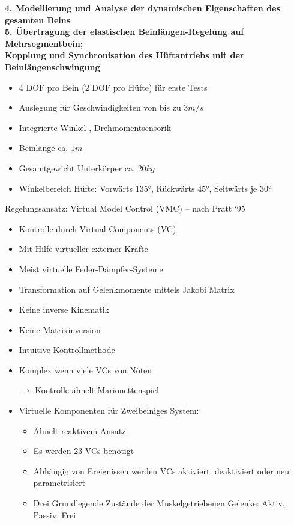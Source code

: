 \textbf{4. Modellierung und Analyse der dynamischen Eigenschaften des gesamten Beins\\
5. Übertragung der elastischen Beinlängen-Regelung auf Mehrsegmentbein;\\
Kopplung und Synchronisation des Hüftantriebs mit der Beinlängenschwingung}
\begin{itemize}
\item 4 DOF pro Bein (2 DOF pro Hüfte) für erste Tests
\item Auslegung für Geschwindigkeiten von bis zu $3m/s$
\item Integrierte Winkel-, Drehmomentsensorik
\item Beinlänge ca. $1m$
\item Gesamtgewicht Unterkörper ca. $20kg$
\item Winkelbereich Hüfte: Vorwärts 135°, Rückwärts 45°, Seitwärts je 30°
\end{itemize}
Regelungsansatz: Virtual Model Control (VMC) – nach Pratt ‘95
\begin{itemize}
\item Kontrolle durch \glqq Virtual Components\grqq{} (VC)
\item Mit Hilfe virtueller externer Kräfte
\item Meist virtuelle Feder-Dämpfer-Systeme
\item Transformation auf Gelenkmomente mittels Jakobi Matrix
\item Keine inverse Kinematik
\item Keine Matrixinversion
\item Intuitive Kontrollmethode
\item Komplex wenn viele VCs von Nöten
\item[$\rightarrow$] Kontrolle ähnelt Marionettenspiel
\item Virtuelle Komponenten für Zweibeiniges System:
\begin{itemize}
\item Ähnelt reaktivem Ansatz
\item Es werden 23 VCs benötigt
\item Abhängig von Ereignissen werden VCs aktiviert, deaktiviert oder neu parametrisiert
\item Drei Grundlegende Zustände der Muskelgetriebenen Gelenke: Aktiv, Passiv, Frei
\end{itemize}
\end{itemize}